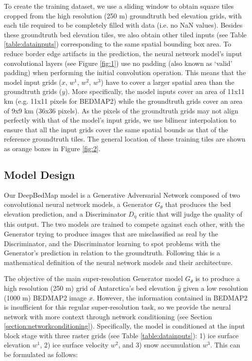 \documentclass[tc, manuscript]{copernicus}
\begin{document}
To create the training dataset, we use a sliding window to obtain square tiles cropped from the high resolution (250 m) groundtruth bed elevation grids, with each tile required to be completely filled with data (i.e. no NaN values).
Besides these groundtruth bed elevation tiles, we also obtain other tiled inputs (see Table \ref{table:datainputs}) corresponding to the same spatial bounding box area.
To reduce border edge artifacts in the prediction, the neural network model's input convolutional layers (see Figure \ref{fig:1}) use no padding (also known as `valid' padding) when performing the initial convolution operation.
This means that the model input grids ($x$, $w^1$, $w^2$, $w^3$) have to cover a larger spatial area than the groundtruth grids ($y$).
More specifically, the model inputs cover an area of 11x11 km (e.g. 11x11 pixels for BEDMAP2) while the groundtruth grids cover an area of 9x9 km (36x36 pixels).
As the pixels of the groundtruth grids may not align perfectly with that of the model's input grids, we use bilinear interpolation to ensure that all the input grids cover the same spatial bounds as that of the reference groundtruth tiles.
The general location of these training tiles are shown as orange boxes in Figure \ref{fig:2}.

\subsection{Model Design} \label{section:modeldesign}

Our DeepBedMap model is a Generative Adversarial Network \citep{GoodfellowGenerativeAdversarialNetworks2014} composed of two convolutional neural network models, a Generator $G_\theta$ that produces the bed elevation prediction, and a Discriminator $D_\eta$ critic that will judge the quality of this output.
The two models are trained to compete against each other, with the Generator trying to produce images that are misclassified as real by the Discriminator, and the Discriminator learning to spot problems with the Generator's prediction in relation to the groundtruth.
Following this is a mathematical definition of the neural network models and their architecture.

The objective of the main super-resolution Generator model $G_\theta$ is to produce a high resolution (250 m) grid of Antarctica's bed elevation $\hat{y}$ given a low resolution (1000 m) BEDMAP2 \citep{FretwellBedmap2improvedice2013} image $x$.
However, the information contained in BEDMAP2 is insufficient for this regular super-resolution task, so we provide the neural network with more context through network conditioning (see Section \ref{section:networkconditioning}).
Specifically, the model is conditioned at the input block stage with three raster grids (see Table \ref{table:datainputs}): 1) ice surface elevation $w^1$, 2) ice surface velocity $w^2$, and 3) snow accumulation $w^3$.
This can be formulated as follows:
\end{document}
